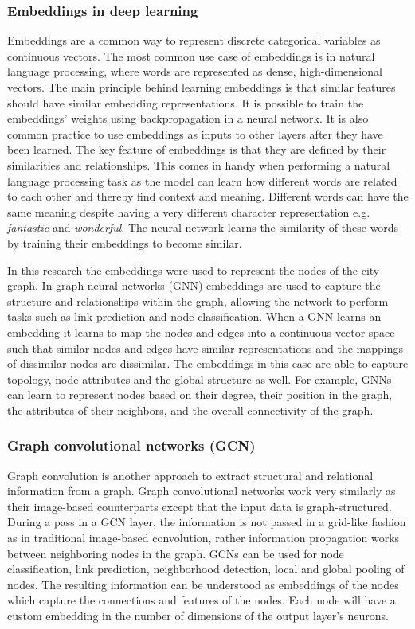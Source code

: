 \documentclass[
]{elteikthesis}[2023/04/10]
\begin{document}
\subsubsection*{Embeddings in deep learning}

Embeddings are a common way to represent discrete categorical variables
as continuous vectors. The most common use case of embeddings is in
natural language processing, where words are represented as dense,
high-dimensional vectors. The main principle behind learning embeddings
is that similar features should have similar embedding representations.
It is possible to train the embeddings' weights using backpropagation
in a neural network. It is also common practice to use embeddings
as inputs to other layers after they have been learned. The key feature
of embeddings is that they are defined by their similarities and relationships.
This comes in handy when performing a natural language processing
task as the model can learn how different words are related to each
other and thereby find context and meaning. Different words can have
the same meaning despite having a very different character representation
e.g. \emph{fantastic} and \emph{wonderful}. The neural network learns
the similarity of these words by training their embeddings to become
similar. 

In this research the embeddings were used to represent the nodes of
the city graph. In graph neural networks (GNN) embeddings are used
to capture the structure and relationships within the graph, allowing
the network to perform tasks such as link prediction and node classification.
When a GNN learns an embedding it learns to map the nodes and edges
into a continuous vector space such that similar nodes and edges have
similar representations and the mappings of dissimilar nodes are dissimilar.
The embeddings in this case are able to capture topology, node attributes
and the global structure as well. For example, GNNs can learn to represent
nodes based on their degree, their position in the graph, the attributes
of their neighbors, and the overall connectivity of the graph.

\subsubsection*{Graph convolutional networks (GCN)}

Graph convolution is another approach to extract structural and relational
information from a graph. Graph convolutional networks work very similarly
as their image-based counterparts except that the input data is graph-structured.
During a pass in a GCN layer, the information is not passed in a grid-like
fashion as in traditional image-based convolution, rather information
propagation works between neighboring nodes in the graph. GCNs can
be used for node classification, link prediction, neighborhood detection,
local and global pooling of nodes. The resulting information can be
understood as embeddings of the nodes which capture the connections
and features of the nodes. Each node will have a custom embedding
in the number of dimensions of the output layer's neurons.
\end{document}
